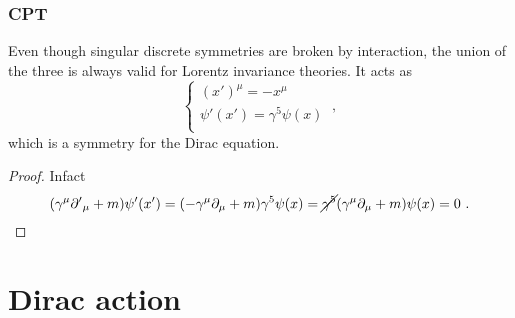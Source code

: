 \subsection{CPT}

    Even though singular discrete symmetries are broken by interaction, the union of the three is always valid for Lorentz invariance theories. It acts as 
    \begin{equation*}
        \begin{cases}
            (x')^\mu = - x^\mu \\
            \psi'(x') = \gamma^5 \psi(x) \\
        \end{cases} ~,
    \end{equation*}
    which is a symmetry for the Dirac equation.
    \begin{proof}
        Infact 
        \begin{equation*}
            (\gamma^\mu {\partial'}_\mu + m) \psi'(x') = (- \gamma^\mu \partial_\mu + m) \gamma^5 \psi(x) = \cancel{\gamma^5} (\gamma^\mu \partial_\mu + m) \psi (x) = 0 ~.
        \end{equation*}
    \end{proof}

\chapter{Dirac action} 

